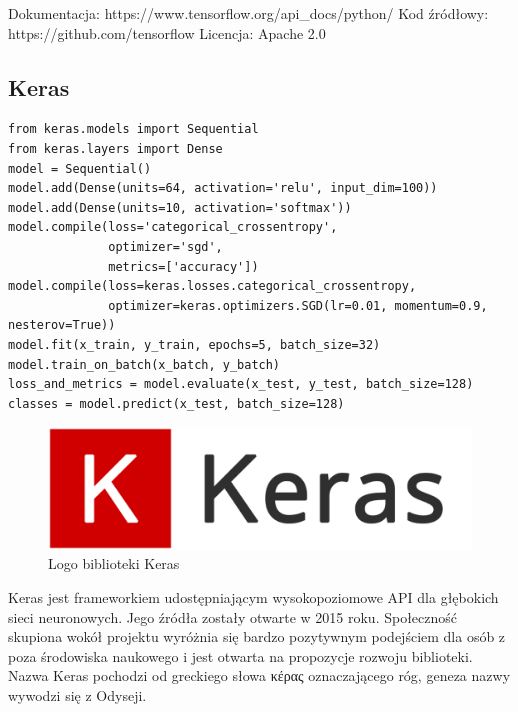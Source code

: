 \documentclass[12pt,a4paper,twoside,titlepage,openright]{book}
\begin{document}
\noindent
\newline 
Dokumentacja: https://www.tensorflow.org/api\_docs/python/
\newline 
Kod źródłowy: https://github.com/tensorflow
\newline 
Licencja: Apache 2.0

\subsection{Keras}

\noindent
\begin{minipage}{\linewidth}
\begin{lstlisting}[caption=Skrypt najprostszego modelu sekwencyjnego (Keras w 30 sekund), label=lst:test]
from keras.models import Sequential
from keras.layers import Dense
model = Sequential()
model.add(Dense(units=64, activation='relu', input_dim=100))
model.add(Dense(units=10, activation='softmax'))
model.compile(loss='categorical_crossentropy',
              optimizer='sgd',
              metrics=['accuracy'])
model.compile(loss=keras.losses.categorical_crossentropy,
              optimizer=keras.optimizers.SGD(lr=0.01, momentum=0.9, nesterov=True))
model.fit(x_train, y_train, epochs=5, batch_size=32)
model.train_on_batch(x_batch, y_batch)
loss_and_metrics = model.evaluate(x_test, y_test, batch_size=128)
classes = model.predict(x_test, batch_size=128)
\end{lstlisting}
\end{minipage}

\begin{figure}[h]
	\centering
			\includegraphics[resolution=100, scale=0.25]{Keras.png}
		\caption{Logo biblioteki Keras}
\end{figure}

Keras jest frameworkiem udostępniającym wysokopoziomowe API dla głębokich sieci neuronowych. Jego źródła zostały otwarte w 2015 roku. Społeczność skupiona wokół projektu wyróżnia się bardzo pozytywnym podejściem dla osób z poza środowiska naukowego i jest otwarta na propozycje rozwoju biblioteki. Nazwa Keras pochodzi od greckiego słowa κέρας oznaczającego róg, geneza nazwy wywodzi się z Odyseji. 
\end{document}
